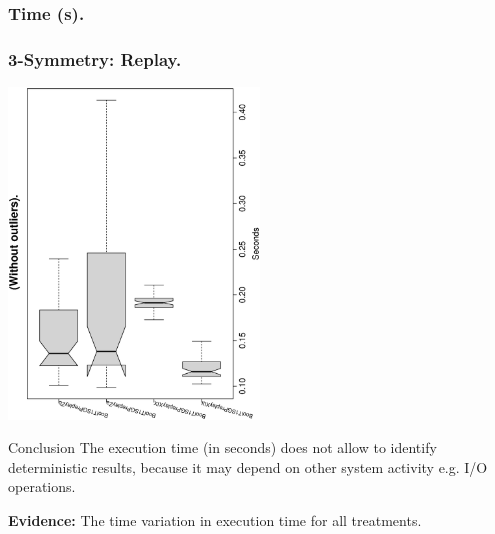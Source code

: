 \documentclass[18pt,c]{beamer}
\makeatletter
\let\beamer@writeslidentry@miniframeson=\beamer@writeslidentry
\newcommand*{\miniframeson}{\let\beamer@writeslidentry=\beamer@writeslidentry@miniframeson}
\makeatother
\begin{document}
 \begin{frame}
 \fontsize{8pt}{9pt}\selectfont
 \frametitle{ Time (s). }

 \label{ExpCStatsTable001.tex}  
 \end{frame}

 \begin{frame}
 \frametitle{ 3-Symmetry: Replay.  }
 \begin{center}
\includegraphics[width=0.5\textwidth, angle=-90]
{ExpCboxplottSeconds001.eps}
 \end{center}
 \label{ExpCboxplottSeconds001.eps}  
 \end{frame}

\begin{frame}
\vspace*{2mm}
\begin{block}{
Conclusion
}
The execution time (in seconds) does not allow to identify deterministic results,
because it may depend on other system activity e.g. I/O operations.
 
{\bf Evidence:}
The time variation in execution time for all treatments.
\end{block}
\end{frame}%
\miniframeson
\end{document}
